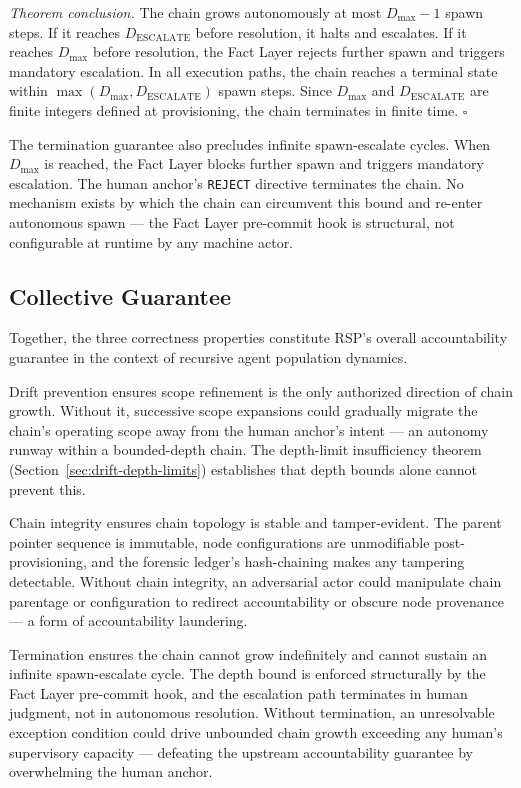 \medskip
\textit{Theorem conclusion.} The chain grows autonomously at most $D_{\max} - 1$ spawn steps. If it reaches $D_{\mathrm{ESCALATE}}$ before resolution, it halts and escalates. If it reaches $D_{\max}$ before resolution, the Fact Layer rejects further spawn and triggers mandatory escalation. In all execution paths, the chain reaches a terminal state within $\max(D_{\max}, D_{\mathrm{ESCALATE}})$ spawn steps. Since $D_{\max}$ and $D_{\mathrm{ESCALATE}}$ are finite integers defined at provisioning, the chain terminates in finite time. $\square$

The termination guarantee also precludes infinite spawn-escalate cycles. When $D_{\max}$ is reached, the Fact Layer blocks further spawn and triggers mandatory escalation. The human anchor's \texttt{REJECT} directive terminates the chain. No mechanism exists by which the chain can circumvent this bound and re-enter autonomous spawn — the Fact Layer pre-commit hook is structural, not configurable at runtime by any machine actor.

\subsection{Collective Guarantee}
\label{sec:rs-collective}

Together, the three correctness properties constitute RSP's overall accountability guarantee in the context of recursive agent population dynamics.

Drift prevention ensures scope refinement is the only authorized direction of chain growth. Without it, successive scope expansions could gradually migrate the chain's operating scope away from the human anchor's intent — an autonomy runway within a bounded-depth chain. The depth-limit insufficiency theorem (Section~\ref{sec:drift-depth-limits}) establishes that depth bounds alone cannot prevent this.

Chain integrity ensures chain topology is stable and tamper-evident. The parent pointer sequence is immutable, node configurations are unmodifiable post-provisioning, and the forensic ledger's hash-chaining makes any tampering detectable. Without chain integrity, an adversarial actor could manipulate chain parentage or configuration to redirect accountability or obscure node provenance — a form of accountability laundering.

Termination ensures the chain cannot grow indefinitely and cannot sustain an infinite spawn-escalate cycle. The depth bound is enforced structurally by the Fact Layer pre-commit hook, and the escalation path terminates in human judgment, not in autonomous resolution. Without termination, an unresolvable exception condition could drive unbounded chain growth exceeding any human's supervisory capacity — defeating the upstream \bxthree accountability guarantee by overwhelming the human anchor.

